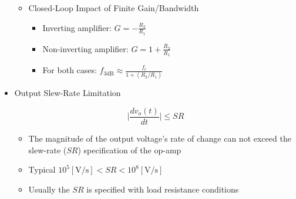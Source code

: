 \begin{itemize}
\begin{itemize}
      \item Closed-Loop Impact of Finite Gain/Bandwidth

        \begin{itemize}

          \item Inverting amplifier: $G=-\frac{R_2}{R_1}$

          \item Non-inverting amplifier: $G=1+\frac{R_2}{R_1}$

          \item For both cases: $f_{3\text{dB}}\approx\frac{f_t}{1+(R_2/R_1)}$

        \end{itemize}

    \end{itemize}

  \item Output Slew-Rate Limitation

    $$\Big|\frac{dv_o(t)}{dt}\Big|\leq SR$$

    \begin{itemize}

      \item The magnitude of the output voltage's rate of change can not exceed the slew-rate ($SR$) specification of the op-amp

      \item Typical $10^5[\si{\volt}/\si{\second}]<SR<10^8[\si{\volt}/\si{\second}]$

      \item Usually the $SR$ is specified with load resistance conditions

    \end{itemize}

\end{itemize}



